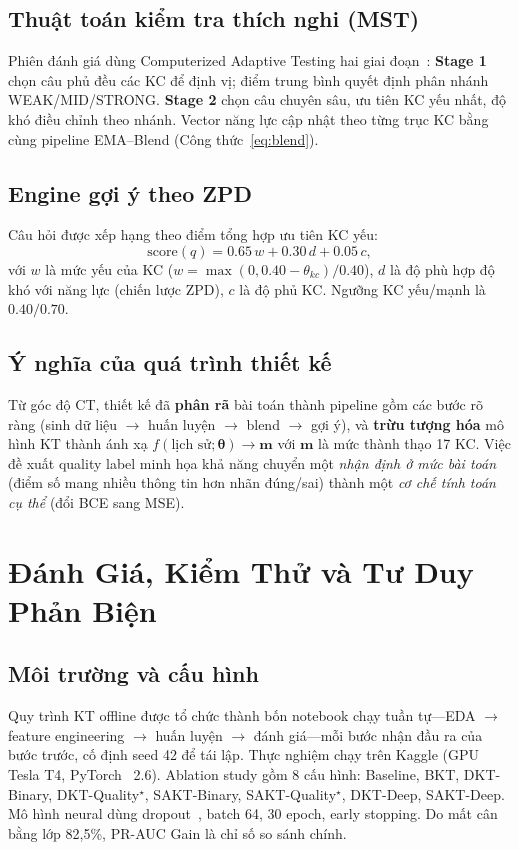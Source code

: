 \documentclass[11pt]{article}
\newcommand{\prauc}{PR-AUC}
\begin{document}
\subsection{Thuật toán kiểm tra thích nghi (MST)}
Phiên đánh giá dùng Computerized Adaptive Testing hai giai đoạn~\cite{wainer2000computerized}: \textbf{Stage 1} chọn câu phủ đều các KC để định vị; điểm trung bình quyết định phân nhánh WEAK/MID/STRONG. \textbf{Stage 2} chọn câu chuyên sâu, ưu tiên KC yếu nhất, độ khó điều chỉnh theo nhánh. Vector năng lực cập nhật theo từng trục KC bằng cùng pipeline EMA--Blend (Công thức~\ref{eq:blend}).

\subsection{Engine gợi ý theo ZPD}
Câu hỏi được xếp hạng theo điểm tổng hợp ưu tiên KC yếu:
\begin{equation}
\text{score}(q)=0.65\,w + 0.30\,d + 0.05\,c,
\end{equation}
với $w$ là mức yếu của KC ($w=\max(0,0.40-\theta_{kc})/0.40$), $d$ là độ phù hợp độ khó với năng lực (chiến lược ZPD), $c$ là độ phủ KC. Ngưỡng KC yếu/mạnh là $0.40/0.70$.

\subsection{Ý nghĩa của quá trình thiết kế}
Từ góc độ CT, thiết kế đã \textbf{phân rã} bài toán thành pipeline gồm các bước rõ ràng (sinh dữ liệu $\to$ huấn luyện $\to$ blend $\to$ gợi ý), và \textbf{trừu tượng hóa} mô hình KT thành ánh xạ $f(\text{lịch sử};\bm{\theta})\to\bm{m}$ với $\bm{m}$ là mức thành thạo 17 KC. Việc đề xuất quality label minh họa khả năng chuyển một \textit{nhận định ở mức bài toán} (điểm số mang nhiều thông tin hơn nhãn đúng/sai) thành một \textit{cơ chế tính toán cụ thể} (đổi BCE sang MSE).

\section{Đánh Giá, Kiểm Thử và Tư Duy Phản Biện}

\subsection{Môi trường và cấu hình}
Quy trình KT offline được tổ chức thành bốn notebook chạy tuần tự---EDA $\to$ feature engineering $\to$ huấn luyện $\to$ đánh giá---mỗi bước nhận đầu ra của bước trước, cố định seed 42 để tái lập. Thực nghiệm chạy trên Kaggle (GPU Tesla T4, PyTorch~\cite{pytorch2019} 2.6). Ablation study gồm 8 cấu hình: Baseline, BKT, DKT-Binary, DKT-Quality$^\star$, SAKT-Binary, SAKT-Quality$^\star$, DKT-Deep, SAKT-Deep. Mô hình neural dùng dropout~\cite{srivastava2014dropout}, batch 64, 30 epoch, early stopping. Do mất cân bằng lớp 82,5\%, \prauc{} Gain là chỉ số so sánh chính.
\end{document}
